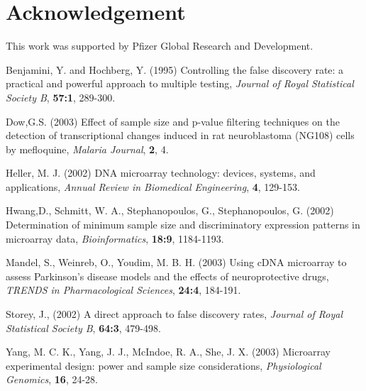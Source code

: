 \documentclass{bioinfo}
\begin{document}
\section*{Acknowledgement}
This work was supported by Pfizer Global Research and Development.

\begin{thebibliography}{}

 Benjamini, Y. and Hochberg, Y. (1995)
  Controlling the false discovery rate: a practical and powerful
  approach to multiple testing, {\it Journal of Royal Statistical
    Society B}, {\bf 57:1}, 289-300.

 Dow,G.S. (2003) Effect of sample size and p-value filtering techniques on the detection of transcriptional changes induced in
  rat neuroblastoma (NG108) cells by mefloquine, {\it Malaria Journal}, {\bf 2}, 4.

 Heller, M. J. (2002) {DNA microarray technology: devices, systems, and applications},
  {\it Annual Review in Biomedical Engineering}, {\bf 4}, 129-153.

 Hwang,D., Schmitt, W. A., Stephanopoulos, G., Stephanopoulos, G. (2002)
  Determination of minimum sample size and discriminatory expression patterns in microarray data,
  {\it Bioinformatics}, {\bf 18:9}, 1184-1193.

 Mandel, S.,  Weinreb, O., Youdim, M. B. H. (2003)
  Using cDNA microarray to assess Parkinson's disease models and
  the effects of neuroprotective drugs, {\it TRENDS in Pharmacological Sciences}, {\bf 24:4}, 184-191.

 Storey, J., (2002)
  A direct approach to false discovery rates, {\it Journal of Royal Statistical Society B}, {\bf 64:3}, 479-498.

 Yang, M. C. K., Yang, J. J., McIndoe, R. A., She, J. X. (2003)
  Microarray experimental design: power and sample size considerations, {\it Physiological Genomics}, {\bf 16}, 24-28.
\end{thebibliography}
\end{document}
